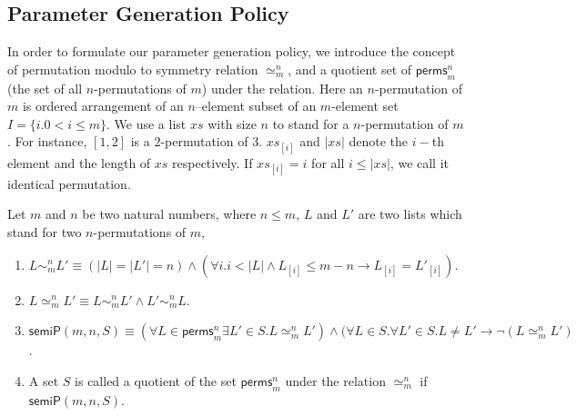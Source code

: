 \documentclass{llncs}
\newcommand\caicomment[1]{\textcolor{red}{comment: #1} }
\begin{document}

\vspace{-0.5cm}
\subsection{Parameter Generation Policy}\label{sec:parameterGenPolicy}
In order to formulate our parameter generation policy, we introduce the concept of permutation modulo to symmetry relation $\simeq_m^n$,  and a quotient set of $\mathsf{perms}_{m}^{n}$ (the set of all $n$-permutations of $m$) under the  relation.  Here an $n$-permutation of $m$ is ordered arrangement of  an $n$--element subset of an $m$-element set $I=\{i. 0<i\le m\}$. We use a list $xs$ with size $n$ to stand for a $n$-permutation of $m$. For instance, $[1,2]$ is a 2-permutation of 3. $xs_{[i]}$ and $|xs|$  denote  the $i-$th element and the length of $xs$ respectively. If $xs_{[i]}=i$ for all $i \le |xs|$, we call it identical permutation. %

\begin{definition}
Let $m$ and $n$ be two natural numbers, where $n \le m$,  $L$ and $L'$ are two lists which stand for two  $n$-permutations of $m$,
\begin{enumerate}
\item
$L \sim_m^n L' \equiv (|L| =|L'|=n) \wedge (\forall i. i<|L| \wedge L_{[i]} \le m-n \longrightarrow L_{[i]}=L'_{[i]}) $.

\item $L \simeq_m^n L' \equiv L \sim_m^n L' \wedge   L' \sim_m^n L$.


\item $\mathsf{semiP}(m,n,S)\equiv (\forall  L \in \mathsf{perms}_{m}^{n} \exists  L' \in S. L \simeq_m^n L' ) \wedge (\forall  L\in S. \forall L'\in S. L \neq L' \longrightarrow \neg  (L \simeq_m^n L' )$.

\item    A set $S$ is called a quotient of the set $\mathsf{perms}_{m}^{n}$ under the relation $\simeq_m^n$ if    $\mathsf{semiP}(m,n,S)$.
\end{enumerate}
\end{definition}
\end{document}
